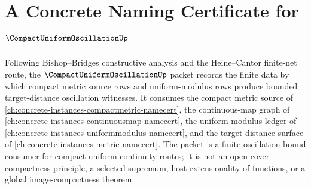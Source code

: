 \chapter{A Concrete Naming Certificate for $\CompactUniformOscillationUp$}
\label{ch:concrete-instances-compact-uniform-oscillation-namecert}

Following Bishop--Bridges constructive analysis and the Heine--Cantor finite-net route, the $\CompactUniformOscillationUp$ packet records the finite data by which compact metric source rows and uniform-modulus rows produce bounded target-distance oscillation witnesses. It consumes the compact metric source of \autoref{ch:concrete-instances-compactmetric-namecert}, the continuous-map graph of \autoref{ch:concrete-instances-continuousmap-namecert}, the uniform-modulus ledger of \autoref{ch:concrete-instances-uniformmodulus-namecert}, and the target distance surface of \autoref{ch:concrete-instances-metric-namecert}. The packet is a finite oscillation-bound consumer for compact-uniform-continuity routes; it is not an open-cover compactness principle, a selected supremum, host extensionality of functions, or a global image-compactness theorem.

